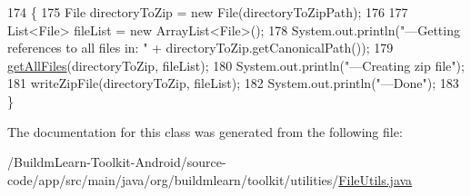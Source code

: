 \begin{DoxyCode}
174                                                                                \{
175         File directoryToZip = \textcolor{keyword}{new} File(directoryToZipPath);
176 
177         List<File> fileList = \textcolor{keyword}{new} ArrayList<File>();
178         System.out.println(\textcolor{stringliteral}{"---Getting references to all files in: "} + directoryToZip.getCanonicalPath());
179         \hyperlink{classorg_1_1buildmlearn_1_1toolkit_1_1utilities_1_1FileUtils_aa61e000a3890f6d8b42c1a537f8c2df4}{getAllFiles}(directoryToZip, fileList);
180         System.out.println(\textcolor{stringliteral}{"---Creating zip file"});
181         writeZipFile(directoryToZip, fileList);
182         System.out.println(\textcolor{stringliteral}{"---Done"});
183     \}
\end{DoxyCode}


The documentation for this class was generated from the following file\-:\begin{DoxyCompactItemize}
\item 
/\-Buildm\-Learn-\/\-Toolkit-\/\-Android/source-\/code/app/src/main/java/org/buildmlearn/toolkit/utilities/\hyperlink{FileUtils_8java}{File\-Utils.\-java}\end{DoxyCompactItemize}
